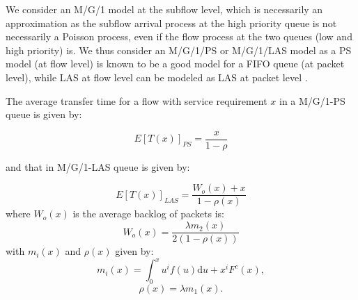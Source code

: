 \documentclass[preprint,12pt]{elsarticle}
\begin{document}
We consider an M/G/1 model at the subflow level, which is necessarily an approximation as the subflow arrival process at the high priority queue is not necessarily a Poisson process, even if the flow process at the two queues (low and high priority) is. We thus consider an M/G/1/PS or M/G/1/LAS model as a PS model (at flow level) is known to be a good model for a  FIFO queue (at packet level), while LAS  at flow level can be modeled as LAS at packet level \cite{Rai04performancemodels}.

The average transfer time for a flow with  service requirement $x$ in a M/G/1-PS queue is given by:

\begin{equation}
E[T(x)]_{PS} = \frac{x}{1-\rho}
\label{eq:ps}
\end{equation}

and that in M/G/1-LAS queue is given by:

\begin{equation}
E[T(x)]_{LAS} = \frac{W_{o}(x) + x}{1-\rho(x)}
\label{eq:las}
\end{equation} 
where $W_{o}(x)$ is the average backlog of packets  is:
\begin{equation}
W_{o}(x) = \frac{\lambda m_{2}(x)}{2(1-\rho(x))}
\end{equation} 
with  $m_{i}(x)$ and $\rho(x)$  given by:
\begin{equation*}
m_{i}(x) = \int_0^x u^i f(u) \mathrm{d}u + x^iF^c(x),
\end{equation*}
\begin{equation*}
\rho(x) = \lambda m_{1}(x).
\end{equation*}
\end{document}
